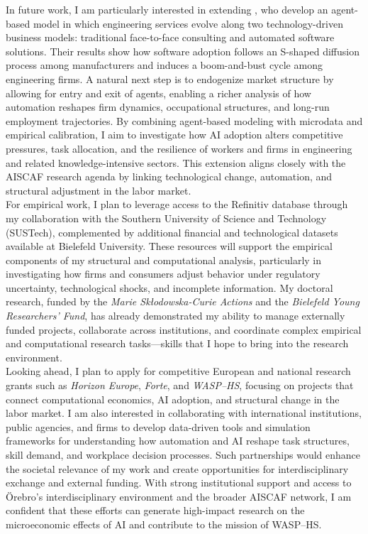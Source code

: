 \documentclass{nfr}
\begin{document}
In future work, I am particularly interested in extending \citet{klugl2024double}, who develop an agent-based model in which engineering services evolve along two technology-driven business models: traditional face-to-face consulting and automated software solutions. Their results show how software adoption follows an S-shaped diffusion process among manufacturers and induces a boom-and-bust cycle among engineering firms. A natural next step is to endogenize market structure by allowing for entry and exit of agents, enabling a richer analysis of how automation reshapes firm dynamics, occupational structures, and long-run employment trajectories. By combining agent-based modeling with microdata and empirical calibration, I aim to investigate how AI adoption alters competitive pressures, task allocation, and the resilience of workers and firms in engineering and related knowledge-intensive sectors. This extension aligns closely with the AISCAF research agenda by linking technological change, automation, and structural adjustment in the labor market.\\

For empirical work, I plan to leverage access to the Refinitiv database through my collaboration with the Southern University of Science and Technology (SUSTech), complemented by additional financial and technological datasets available at Bielefeld University. 
These resources will support the empirical components of my structural and computational analysis, particularly in investigating how firms and consumers adjust behavior under regulatory uncertainty, technological shocks, and incomplete information. 
My doctoral research, funded by the \textit{Marie Skłodowska-Curie Actions} and the \textit{Bielefeld Young Researchers’ Fund}, has already demonstrated my ability to manage externally funded projects, collaborate across institutions, and coordinate complex empirical and computational research tasks—skills that I hope to bring into the research environment.\\

Looking ahead, I plan to apply for competitive European and national research grants such as \textit{Horizon Europe}, \textit{Forte}, and \textit{WASP–HS}, focusing on projects that connect computational economics, AI adoption, and structural change in the labor market. 
I am also interested in collaborating with international institutions, public agencies, and firms to develop data-driven tools and simulation frameworks for understanding how automation and AI reshape task structures, skill demand, and workplace decision processes. 
Such partnerships would enhance the societal relevance of my work and create opportunities for interdisciplinary exchange and external funding. 
With strong institutional support and access to Örebro’s interdisciplinary environment and the broader AISCAF network, I am confident that these efforts can generate high-impact research on the microeconomic effects of AI and contribute to the mission of WASP–HS.\\
\end{document}
